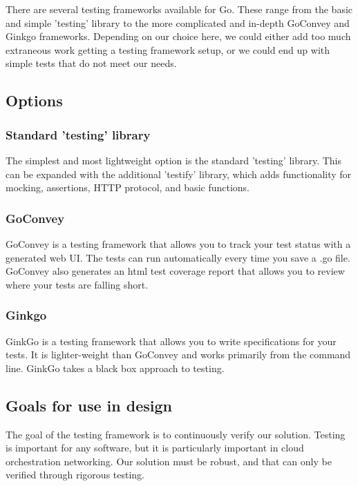 \documentclass[10pt,letterpaper,onecolumn,draftclsnofoot]{IEEEtran}
\begin{document}
There are several testing frameworks available for Go. These range from the
basic and simple 'testing' library to the more complicated and in-depth GoConvey
and Ginkgo frameworks. Depending on our choice here, we could either add too
much extraneous work getting a testing framework setup, or we could end up with
simple tests that do not meet our needs.

\subsection{Options}

\subsubsection{Standard 'testing' library}

The simplest and most lightweight option is the standard 'testing' library. This
can be expanded with the additional 'testify' library, which adds functionality
for mocking, assertions, HTTP protocol, and basic functions.

\subsubsection{GoConvey}

GoConvey is a testing framework that allows you to track your test status with a
generated web UI. The tests can run automatically every time you save a .go
file. GoConvey also generates an html test coverage report that allows you to
review where your tests are falling short.

\subsubsection{Ginkgo}

GinkGo is a testing framework that allows you to write specifications for your
tests. It is lighter-weight than GoConvey and works primarily from the command
line. GinkGo takes a black box approach to testing.

\subsection{Goals for use in design}

The goal of the testing framework is to continuously verify our solution.
Testing is important for any software, but it is particularly important in cloud
orchestration networking. Our solution must be robust, and that can only be
verified through rigorous testing.
\end{document}
